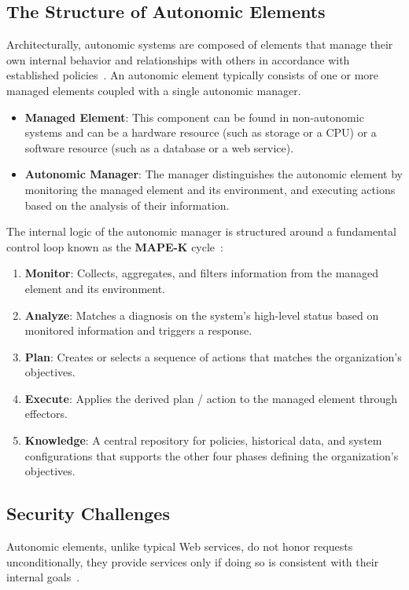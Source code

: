 \subsection{The Structure of Autonomic Elements}
Architecturally, autonomic systems are composed of elements that manage their own internal behavior and relationships with others in accordance with established policies~\cite{kephart2003vision}. An autonomic element typically consists of one or more managed elements coupled with a single autonomic manager.

\begin{itemize}
    \item \textbf{Managed Element}: This component can be found in non-autonomic systems and can be a hardware resource (such as storage or a CPU) or a software resource (such as a database or a web service).
    \item \textbf{Autonomic Manager}: The manager distinguishes the autonomic element by monitoring the managed element and its environment, and executing actions based on the analysis of their information.
\end{itemize}

The internal logic of the autonomic manager is structured around a fundamental control loop known as the \textbf{MAPE-K} cycle~\cite{kephart2003vision}:
\begin{enumerate}
    \item \textbf{Monitor}: Collects, aggregates, and filters information from the managed element and its environment.
    \item \textbf{Analyze}: Matches a diagnosis on the system's high-level status based on monitored information and triggers a response.
    \item \textbf{Plan}: Creates or selects a sequence of actions that matches the organization's objectives.
    \item \textbf{Execute}: Applies the derived plan / action to the managed element through effectors.
    \item \textbf{Knowledge}: A central repository for policies, historical data, and system configurations that supports the other four phases defining the organization's objectives.
\end{enumerate}

\subsection{Security Challenges}
Autonomic elements, unlike typical Web services, do not honor requests unconditionally, they provide services only if doing so is consistent with their internal goals~\cite{kephart2003vision}.

